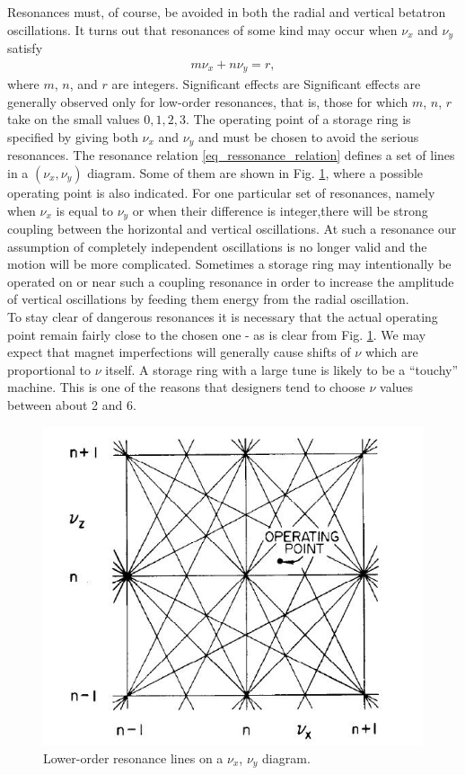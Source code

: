 Resonances must, of course, be avoided in both the radial and vertical betatron oscillations. It turns out that resonances of some kind may occur when $\nu_x$ and $\nu_y$ satisfy
\begin{align}\label{eq_ressonance_relation}
	m \nu_x + n \nu_y = r, 
\end{align}
where $m$, $n$, and $r$ are integers. Significant effects are  Significant effects are generally observed only for low-order resonances, that is, those for which $m$, $n$, $r$ take on the small values $0, 1, 2, 3$. The operating point of a storage ring is specified by giving both $\nu_x$
and $\nu_y$ and must be chosen to avoid the serious resonances. The resonance relation \eqref{eq_ressonance_relation} defines a set of lines in a $(\nu_x, \nu_y)$ diagram. Some of them are shown in Fig. \ref{fig:lower_order_resonance_lines}, where a possible operating point is also indicated. For one particular set of resonances, namely when $\nu_x$ is equal to $\nu_y$ or when their difference is integer,there will be strong coupling between the horizontal and vertical oscillations. At such a resonance our assumption of completely independent oscillations is no longer valid and the motion will be more complicated. Sometimes a storage ring may intentionally be operated on or near such a coupling resonance in order to increase the amplitude of vertical oscillations by feeding them energy from the radial oscillation. \\
To stay clear of dangerous resonances it is necessary that the actual operating point remain fairly close to the chosen one - as is clear from Fig. \ref{fig:lower_order_resonance_lines}. We may expect that magnet imperfections will generally cause shifts of $\nu$ which are proportional to $\nu$ itself. A storage ring with a large tune is likely to be a “touchy” machine. This is one of the reasons that designers tend to choose $\nu$ values between about 2 and 6.

\begin{figure}[!htb]
	\centering
	\includegraphics[width=0.7\linewidth]{./Figuras/fig14.jpeg}
	\caption{Lower-order resonance lines on a $\nu_x$, $\nu_y$ diagram.}
	\label{fig:lower_order_resonance_lines}
\end{figure}

